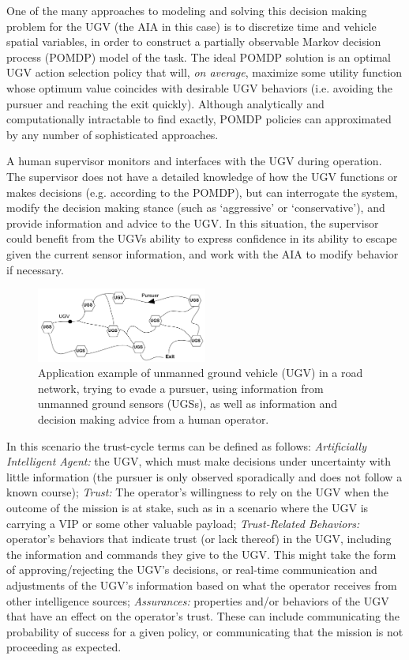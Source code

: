 One of the many approaches to modeling and solving this decision making problem for the UGV (the AIA in this case) is to discretize time and vehicle spatial variables, in order to construct a partially observable Markov decision process (POMDP) model of the task. 
The ideal POMDP solution is an optimal UGV action selection policy that will, \emph{on average}, maximize some utility function whose optimum value coincides with desirable UGV behaviors (i.e. avoiding the pursuer and reaching the exit quickly). 
Although analytically and computationally intractable to find exactly, POMDP policies can approximated by any number of sophisticated approaches.

    A human supervisor monitors and interfaces with the UGV during operation. The supervisor does not have a detailed knowledge of how the UGV functions or makes decisions (e.g. according to the POMDP), but can interrogate the system, modify the decision making stance (such as `aggressive' or `conservative'), and provide information and advice to the UGV. In this situation, the supervisor could benefit from the UGVs ability to express confidence in its ability to escape given the current sensor information, and work with the AIA to modify behavior if necessary. 
    
	\begin{figure}[htbp]
    	\centering
     	\includegraphics[width=0.5\textwidth]{Figures/RoadNet}
    	\caption{Application example of unmanned ground vehicle (UGV) in a road network, trying to evade a pursuer, using information from unmanned ground sensors (UGSs), as well as information and decision making advice from a human operator.} %
        \label{fig:RoadNet}
    \end{figure}

In this scenario the trust-cycle terms can be defined as follows: \textit{Artificially Intelligent Agent:} the UGV, which must make decisions under uncertainty with little information (the pursuer is only observed sporadically and does not follow a known course); \textit{Trust:} The operator's willingness to rely on the UGV when the outcome of the mission is at stake, such as in a scenario where the UGV is carrying a VIP or some other valuable payload; 
\textit{Trust-Related Behaviors:} operator's behaviors that indicate trust (or lack thereof) in the UGV, including the information and commands they give to the UGV. This might take the form of approving/rejecting the UGV's decisions, or real-time communication and adjustments of the UGV's information based on what the operator receives from other intelligence sources; 
\textit{Assurances:} properties and/or behaviors of the UGV that have an effect on the operator's trust. These can include communicating the probability of success for a given policy, or communicating that the mission is not proceeding as expected.

